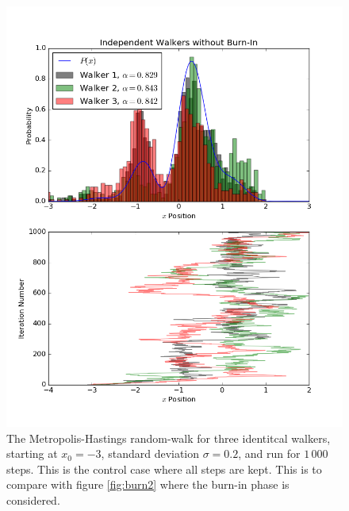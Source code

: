 \begin{figure}
  \centering
  \includegraphics[width=\linewidth]{burn1.png}
  \caption{
    The Metropolis-Hastings random-walk for three identitcal walkers, starting
    at $x_0 = -3$, standard deviation $\sigma = 0.2$, and run for $1\,000$
    steps. This is the control case where all steps are kept. This is to compare
    with figure \ref{fig:burn2} where the burn-in phase is considered.
  }
  \label{fig:burn1}
\end{figure}

